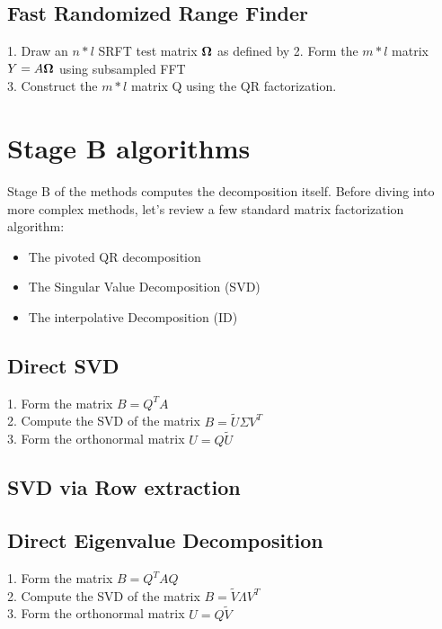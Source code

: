 \documentclass[onecolumn,12pt]{article}
\begin{document}
\subsection{Fast Randomized Range Finder}

1. Draw an $n * l$ SRFT test matrix $\bold{\Omega}$ as defined by %
2. Form the $m * l$ matrix $Y = A \bold{\Omega}$ using subsampled FFT \\
3. Construct the $m *l$ matrix Q using the QR factorization. \\


\section{Stage B algorithms}

Stage B of the methods computes the decomposition itself. Before diving into
more complex methods, let's review a few standard matrix factorization
algorithm:

\begin{itemize}
\item The pivoted QR decomposition
\item The Singular Value Decomposition (SVD)
\item The interpolative Decomposition (ID)
\end{itemize}

\subsection{Direct SVD}

1. Form the matrix $B = Q^T A$ \\
2. Compute the SVD of the matrix $ B = \tilde{U}\Sigma V^T$ \\
3. Form the orthonormal matrix $U = Q \tilde{U}$ \\

\subsection{SVD via Row extraction}

\subsection{Direct Eigenvalue Decomposition}
1. Form the matrix $B = Q^T A Q$ \\
2. Compute the SVD of the matrix $ B = \tilde{V}\Lambda V^T$ \\
3. Form the orthonormal matrix $U = Q \tilde{V}$ \\
\end{document}
